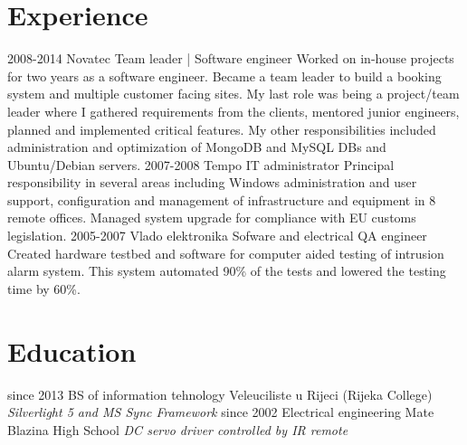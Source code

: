 \documentclass[]{cv}
\begin{document}
\section{Experience}

\begin{entrylist}
  \entry
    {2008-2014}
    {Novatec}
    {Team leader | Software engineer}
    {Worked on in-house projects for two years as a software engineer. Became a team leader to build a booking system and multiple customer facing sites. My last role was being a project/team leader where I gathered requirements from the clients, mentored junior engineers, planned and implemented critical features. My other responsibilities included administration and optimization of MongoDB and MySQL DBs and Ubuntu/Debian servers.}
  \entry
    {2007-2008}
    {Tempo}
    {IT administrator}
    {Principal responsibility in several areas including Windows administration and user support, configuration and management of infrastructure and equipment in 8 remote offices. Managed system upgrade for compliance with EU customs legislation.}
  \entry
    {2005-2007}
    {Vlado elektronika}
    {Sofware and electrical QA engineer}
    {Created hardware testbed and software for computer aided testing of intrusion alarm system. This system automated 90\% of the tests and lowered the testing time by 60\%.}
\end{entrylist}

\section{Education}

\begin{entrylist}
  \entry
    {since 2013}
    {BS of information tehnology}
    {Veleuciliste u Rijeci (Rijeka College)}
    {\emph{Silverlight 5 and MS Sync Framework}}
  \entry
    {since 2002}
    {Electrical engineering}
    {Mate Blazina High School}
    {\emph{DC servo driver controlled by IR remote}}
\end{entrylist}
\end{document}
